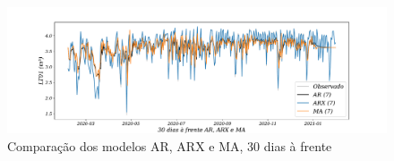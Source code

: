 \begin{figure}[!htpb]
	\centering
	\caption{Comparação dos modelos AR, ARX e MA, 30 dias à frente }
	\label{fig:60-AR-ARX-MA24}
	\includegraphics[width=1\linewidth]{Apendices/Figuras/modelagem-24h/30-AR-ARX-MA}
	
\end{figure}

